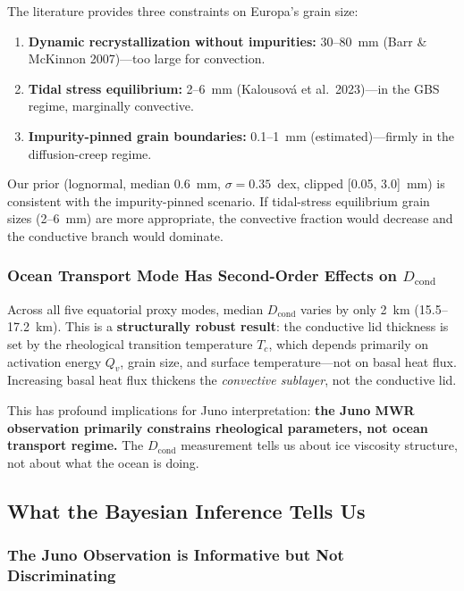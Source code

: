 \documentclass[11pt,letterpaper]{article}
\begin{document}
The literature provides three constraints on Europa's grain size:
\begin{enumerate}[nosep]
  \item \textbf{Dynamic recrystallization without impurities:} 30--80~mm (Barr \& McKinnon 2007)---too large for convection.
  \item \textbf{Tidal stress equilibrium:} 2--6~mm (Kalousov\'{a} et al.\ 2023)---in the GBS regime, marginally convective.
  \item \textbf{Impurity-pinned grain boundaries:} 0.1--1~mm (estimated)---firmly in the diffusion-creep regime.
\end{enumerate}

Our prior (lognormal, median 0.6~mm, $\sigma = 0.35$~dex, clipped [0.05, 3.0]~mm) is consistent with the impurity-pinned scenario. If tidal-stress equilibrium grain sizes (2--6~mm) are more appropriate, the convective fraction would decrease and the conductive branch would dominate.

\subsubsection{Ocean Transport Mode Has Second-Order Effects on $D_\mathrm{cond}$}

Across all five equatorial proxy modes, median $D_\mathrm{cond}$ varies by only 2~km (15.5--17.2~km). This is a \textbf{structurally robust result}: the conductive lid thickness is set by the rheological transition temperature $T_c$, which depends primarily on activation energy $Q_v$, grain size, and surface temperature---not on basal heat flux. Increasing basal heat flux thickens the \textit{convective sublayer}, not the conductive lid.

This has profound implications for Juno interpretation: \textbf{the Juno MWR observation primarily constrains rheological parameters, not ocean transport regime.} The $D_\mathrm{cond}$ measurement tells us about ice viscosity structure, not about what the ocean is doing.

\subsection{What the Bayesian Inference Tells Us}

\subsubsection{The Juno Observation is Informative but Not Discriminating}
\end{document}

